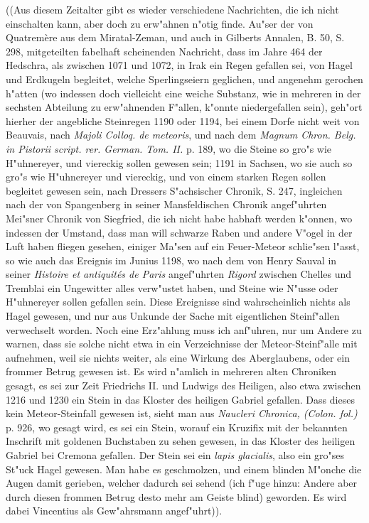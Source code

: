 \documentclass[a4paper, 11pt, oneside, polutonikogreek, german]{article}
\begin{document}
((Aus diesem Zeitalter gibt es wieder verschiedene Nachrichten, die ich nicht einschalten kann, aber doch zu erw"ahnen n"otig finde. Au"ser der von Quatremère aus dem Miratal-Zeman, und auch in Gilberts Annalen, B. 50, S. 298, mitgeteilten fabelhaft scheinenden Nachricht, dass im Jahre 464 der Hedschra, als zwischen 1071 und 1072, in Irak ein Regen gefallen sei, von Hagel und Erdkugeln begleitet, welche Sperlingseiern geglichen, und angenehm gerochen h"atten (wo indessen doch vielleicht eine weiche Substanz, wie in mehreren in der sechsten Abteilung zu erw"ahnenden F"allen, k"onnte niedergefallen sein), geh"ort hierher der angebliche Steinregen 1190 oder 1194, bei einem Dorfe nicht weit von Beauvais, nach \emph{Majoli Colloq. de meteoris}, und nach dem \emph{Magnum Chron. Belg. in Pistorii script. rer. German. Tom. II.} p. 189, wo die Steine so gro"s wie H"uhnereyer, und viereckig sollen gewesen sein; 1191 in Sachsen, wo sie auch so gro"s wie H"uhnereyer und viereckig, und von einem starken Regen sollen begleitet gewesen sein, nach Dressers S"achsischer Chronik, S. 247, ingleichen nach der von Spangenberg in seiner Mansfeldischen Chronik angef"uhrten Mei"sner Chronik von Siegfried, die ich nicht habe habhaft werden k"onnen, wo indessen der Umstand, dass man will schwarze Raben und andere V"ogel in der Luft haben fliegen gesehen, einiger Ma"sen auf ein Feuer-Meteor schlie"sen l"asst, so wie auch das Ereignis im Junius 1198, wo nach dem von Henry Sauval in seiner \emph{Histoire et antiquités de Paris} angef"uhrten \emph{Rigord} zwischen Chelles und Tremblai ein Ungewitter alles verw"ustet haben, und Steine wie N"usse oder H"uhnereyer sollen gefallen sein. Diese Ereignisse sind wahrscheinlich nichts als Hagel gewesen, und nur aus Unkunde der Sache mit eigentlichen Steinf"allen verwechselt worden. Noch eine Erz"ahlung muss ich anf"uhren, nur um Andere zu warnen, dass sie solche nicht etwa in ein Verzeichnisse der Meteor-Steinf"alle mit aufnehmen, weil sie nichts weiter, als eine Wirkung des Aberglaubens, oder ein frommer Betrug gewesen ist. Es wird n"amlich in mehreren alten Chroniken gesagt, es sei zur Zeit Friedrichs II. und Ludwigs des Heiligen, also etwa zwischen 1216 und 1230 ein Stein in das Kloster des heiligen Gabriel gefallen. Dass dieses kein Meteor-Steinfall gewesen ist, sieht man aus \emph{Naucleri Chronica, (Colon. fol.)} p. 926, wo gesagt wird, es sei ein Stein, worauf ein Kruzifix mit der bekannten Inschrift mit goldenen Buchstaben zu sehen gewesen, in das Kloster des heiligen Gabriel bei Cremona gefallen. Der Stein sei ein \emph{lapis glacialis}, also ein gro"ses St"uck Hagel gewesen. Man habe es geschmolzen, und einem blinden M"onche die Augen damit gerieben, welcher dadurch sei sehend (ich f"uge hinzu: Andere aber durch diesen frommen Betrug desto mehr am Geiste blind) geworden. Es wird dabei Vincentius als Gew"ahrsmann angef"uhrt)).
\end{document}
